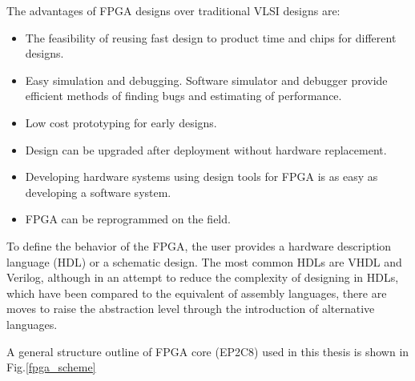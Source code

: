The advantages of FPGA designs over traditional VLSI designs are:
\begin{itemize}
\item The feasibility of reusing fast design to product time and chips for different designs.
\item Easy simulation and debugging. Software simulator and debugger provide
efficient methods of finding bugs and estimating of performance.
\item Low cost prototyping for early designs.
\item Design can be upgraded after deployment without hardware replacement.
\item Developing  hardware  systems  using  design  tools  for  FPGA  is  as  easy  as developing a software system.
\item FPGA can be reprogrammed on the field. 
\end{itemize}

To define the behavior of the FPGA, the user provides a hardware description language (HDL) or a schematic design. The most common HDLs are VHDL and Verilog, although in an attempt to reduce the complexity of designing in HDLs, which have been compared to the equivalent of assembly languages, there are moves to raise the abstraction level through the introduction of alternative languages. 

A general structure outline of FPGA core (EP2C8) used in this thesis is shown in Fig.\ref{fpga_scheme}


